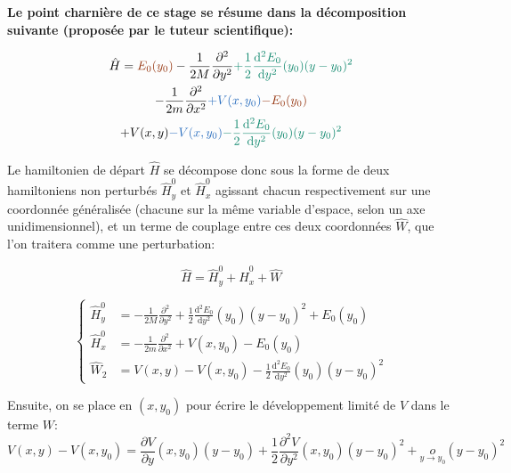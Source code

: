\documentclass[svgnames,dvipsnames,a4paper,10pt,french]{report}
\begin{document}
\textbf{Le point charnière de ce stage se résume dans la décomposition suivante (proposée par le tuteur scientifique):}


\begin{multline}
    \hat{H} = \textcolor{RawSienna}{E_0(y_0)} 
     - \frac{1}{2M} \frac{\partial^2}{\partial y^2} \textcolor{PineGreen}{+ \frac{1}{2} \frac{\mathrm{d}^2 E_0}{\mathrm{d}y^2}(y_0)(y-y_0)^2} \\
     - \frac{1}{2m} \frac{\partial^2}{\partial x^2} \textcolor{NavyBlue}{+ V(x,y_0)}   \textcolor{RawSienna}{- E_0(y_0)} \\
     + V(x,y) \textcolor{NavyBlue}{- V(x,y_0)} \textcolor{PineGreen}{- \frac{1}{2} \frac{\mathrm{d}^2 E_0}{\mathrm{d}y^2}(y_0)(y-y_0)^2}
\end{multline}

Le hamiltonien de départ $\hat{H}$ se décompose donc sous la forme de deux hamiltoniens non perturbés $\hat{H}^0_y$ et $\hat{H}^0_x$ agissant chacun respectivement sur une coordonnée généralisée (chacune sur la même variable d'espace, selon un axe unidimensionnel), et un terme de couplage entre ces deux coordonnées $\hat{W}$, que l'on traitera comme une perturbation:

\begin{equation}
    \hat{H} = \hat{H}^0_y + \hat{H}^0_x + \hat{W} 
\end{equation}

\begin{equation}
\label{3termes}
       \left\{  \begin{array}{ll}
        \hat{H}^0_y &= 
     - \frac{1}{2M} \frac{\partial^2}{\partial y^2} + \frac{1}{2} \frac{\mathrm{d}^2 E_0}{\mathrm{d}y^2}(y_0)(y-y_0)^2 +E_0(y_0) \\
        \hat{H}^0_x &= - \frac{1}{2m} \frac{\partial^2}{\partial x^2} + V(x,y_0) -E_0(y_0) \\
        \hat{W}_2 &=   V(x,y) - V(x,y_0) - \frac{1}{2} \frac{\mathrm{d}^2 E_0}{\mathrm{d}y^2}(y_0)(y-y_0)^2
    \end{array}\right.
\end{equation}


Ensuite, on se place en $(x,y_0)$ pour écrire le développement limité de $V$ dans le terme $W$:
\begin{equation}
    V(x,y) - V(x,y_0) = \frac{\partial V}{\partial y}(x,y_0)(y-y_0) + \frac{1}{2}\frac{\partial^2V}{\partial y^2}(x,y_0)(y-y_0)^2 + \underset{y\rightarrow y_0}{o} (y-y_0)^2 
\end{equation}
\end{document}
